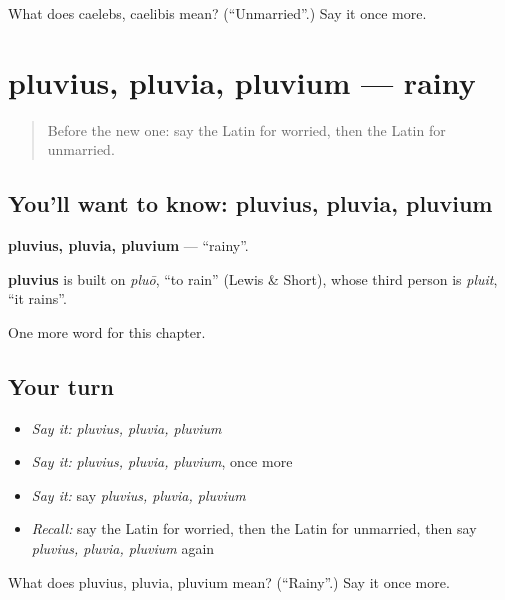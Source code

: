 \begin{tcolorbox}[breakable,colback=teal!4,colframe=teal!35!black,title={Before you move on}]
What does caelebs, caelibis mean? (\textquotedblleft{}Unmarried\textquotedblright{}.) Say it once more.
\end{tcolorbox}
\section[pluvius, pluvia, pluvium]{pluvius, pluvia, pluvium — rainy}

\label{lesson:LA-C241-pluvius}



\begin{quote}
Before the new one: say the Latin for worried, then the Latin for unmarried.
\end{quote}

\subsection*{You'll want to know: pluvius, pluvia, pluvium}
\textbf{pluvius, pluvia, pluvium} — \textquotedblleft{}rainy\textquotedblright{}.

\begin{cousinweb}
\textbf{pluvius} is built on \emph{pluō}, \textquotedblleft{}to rain\textquotedblright{} (Lewis \& Short), whose third person is \emph{pluit}, \textquotedblleft{}it rains\textquotedblright{}.
\end{cousinweb}

\begin{grammarlens}[title={What you've built}]
One more word for this chapter.
\end{grammarlens}

\subsection*{Your turn}
\begin{itemize}
\raggedright
  \item \emph{Say it:} \emph{pluvius, pluvia, pluvium}
  \item \emph{Say it:} \emph{pluvius, pluvia, pluvium}, once more
  \item \emph{Say it:} say \emph{pluvius, pluvia, pluvium}
  \item \emph{Recall:} say the Latin for worried, then the Latin for unmarried, then say \emph{pluvius, pluvia, pluvium} again
\end{itemize}

\begin{tcolorbox}[breakable,colback=teal!4,colframe=teal!35!black,title={Before you move on}]
What does pluvius, pluvia, pluvium mean? (\textquotedblleft{}Rainy\textquotedblright{}.) Say it once more.
\end{tcolorbox}
